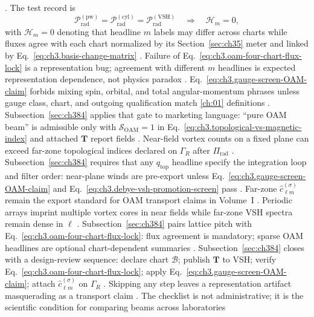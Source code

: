 \cite{allen1992}. The test record is
\begin{equation}
\label{eq:ch3.oam-four-chart-flux-lock}
\mathcal{P}_{\mathrm{rad}}^{(\mathrm{pw})}
=
\mathcal{P}_{\mathrm{rad}}^{(\mathrm{cyl})}
=
\mathcal{P}_{\mathrm{rad}}^{(\mathrm{VSH})}
\quad\Longrightarrow\quad
\mathcal{H}_{m}=0,
\end{equation}
with \(\mathcal{H}_{m}=0\) denoting that headline \(m\) labels may differ across charts while fluxes agree
with each chart normalized by its Section~\ref{sec:ch35} meter and linked by Eq.~\eqref{eq:ch3.basis-change-matrix} \cite{poynting1884}. Failure of Eq.~\eqref{eq:ch3.oam-four-chart-flux-lock} is a representation bug; agreement with different \(m\) headlines is expected representation dependence, not physics paradox
\cite{belinfante1940}.
Eq.~\eqref{eq:ch3.gauge-screen-OAM-claim} forbids mixing spin, orbital, and total angular-momentum phrases unless gauge class, chart, and outgoing qualification match \ref{ch:01} definitions
\cite{belinfante1940}. Subsection~\ref{sec:ch384} applies that gate to marketing language: ``pure OAM beam'' is admissible only with \(\mathcal{S}_{\mathrm{OAM}}=1\) in Eq.~\eqref{eq:ch3.topological-vs-magnetic-index} and attached \(\mathbf{T}\) report fields
\cite{allen1992}.
Near-field vortex counts on a fixed plane can exceed far-zone topological indices declared on \(\Gamma_R\) after \(\Pi_{\mathrm{rad}}\)
\cite{allen1992}. Subsection~\ref{sec:ch384} requires that any \(q_{\mathrm{top}}\) headline specify the integration loop and filter order: near-plane winds are pre-export unless Eq.~\eqref{eq:ch3.gauge-screen-OAM-claim} and Eq.~\eqref{eq:ch3.debye-vsh-promotion-screen} pass
\cite{stratton1941}. Far-zone \(\widehat{c}_{\ell m}^{(\sigma)}\) remain the export standard for OAM transport claims in Volume~I
\cite{harrington2001}.
Periodic arrays imprint multiple vortex cores in near fields while far-zone VSH spectra remain dense in \(\ell\)
\cite{jackson1999}. Subsection~\ref{sec:ch384} pairs lattice pitch with Eq.~\eqref{eq:ch3.oam-four-chart-flux-lock}: flux agreement is mandatory; sparse OAM headlines are optional chart-dependent summaries
\cite{hansen1988}.
Subsection~\ref{sec:ch384} closes with a design-review sequence: declare chart \(\mathcal{B}\); publish \(\mathbf{T}\) to VSH; verify Eq.~\eqref{eq:ch3.oam-four-chart-flux-lock}; apply Eq.~\eqref{eq:ch3.gauge-screen-OAM-claim}; attach \(\widehat{c}_{\ell m}^{(\sigma)}\) on \(\Gamma_R\)
\cite{allen1992}. Skipping any step leaves a representation artifact masquerading as a transport claim
\cite{stratton1941}. The checklist is not administrative; it is the scientific condition for comparing beams across laboratories
